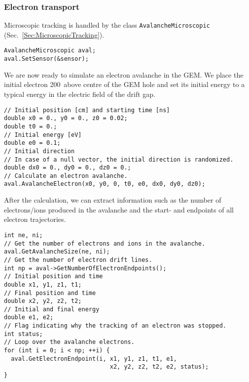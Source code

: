 \subsubsection{Electron transport}
Microscopic tracking is handled by the class 
\texttt{AvalancheMicroscopic} (Sec.~\ref{Sec:MicroscopicTracking}).
\begin{lstlisting}
AvalancheMicroscopic aval;
aval.SetSensor(&sensor);
\end{lstlisting}
We are now ready to simulate an electron avalanche in the GEM.
We place the initial electron 200\, above centre of the GEM hole 
and set its initial energy to a typical energy in the electric field 
of the drift gap.
\begin{lstlisting}
// Initial position [cm] and starting time [ns]
double x0 = 0., y0 = 0., z0 = 0.02;
double t0 = 0.;
// Initial energy [eV]
double e0 = 0.1;
// Initial direction 
// In case of a null vector, the initial direction is randomized.
double dx0 = 0., dy0 = 0., dz0 = 0.;
// Calculate an electron avalanche.
aval.AvalancheElectron(x0, y0, 0, t0, e0, dx0, dy0, dz0);
\end{lstlisting}
After the calculation, we can extract information such as
the number of electrons/ions produced in the avalanche
and the start- and endpoints of all electron trajectories. 
\begin{lstlisting}
int ne, ni;
// Get the number of electrons and ions in the avalanche.
aval.GetAvalancheSize(ne, ni);
// Get the number of electron drift lines.
int np = aval->GetNumberOfElectronEndpoints();
// Initial position and time
double x1, y1, z1, t1;
// Final position and time
double x2, y2, z2, t2;
// Initial and final energy
double e1, e2;
// Flag indicating why the tracking of an electron was stopped.
int status;
// Loop over the avalanche electrons.
for (int i = 0; i < np; ++i) {
  aval.GetElectronEndpoint(i, x1, y1, z1, t1, e1,
                              x2, y2, z2, t2, e2, status);
} 
\end{lstlisting}
